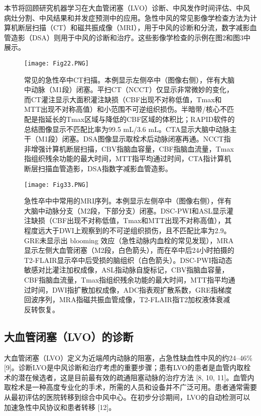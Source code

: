 \documentclass[11pt]{article}
\begin{document}
本节将回顾研究机器学习在大血管闭塞（LVO）诊断、中风发作时间评估、中风病灶分割、中风结果和并发症预测中的应用。急性中风的常见影像学检查方法为计算机断层扫描（CT）和磁共振成像（MRI），用于中风的诊断和分流，数字减影血管造影（DSA）则用于中风的诊断和治疗。这些影像学检查的示例在图2和图3中展示。

\begin{figure}[!htb]
	\centering
	\texttt{[image: Fig22.PNG]}
	\caption{\kaishu 常见的急性卒中CT扫描。本例显示左侧卒中（图像右侧），伴有大脑中动脉（M1段）闭塞。平扫CT（NCCT）仅显示非常微妙的变化，而CT灌注显示大面积灌注缺损（CBF出现不对称低值，Tmax和MTT出现不对称高值）和小范围不可逆组织损伤。半暗带/核心不匹配是指延长的Tmax区域与降低的CBF区域的体积比；RAPID软件的总结图像显示不匹配比率为99.5 mL/3.6 mL。CTA显示大脑中动脉主干（M1段）闭塞。DSA图像显示取栓术后动脉闭塞再通。NCCT指非增强计算机断层扫描，CBV指脑血容量，CBF指脑血流量，Tmax指组织残余功能的最大时间，MTT指平均通过时间，CTA指计算机断层扫描血管造影，DSA指数字减影血管造影。}
	\label{Fig2}
\end{figure}

\begin{figure}[!htb]
	\centering
	\texttt{[image: Fig33.PNG]}
	\caption{\kaishu 急性卒中中常用的MRI序列。本例显示左侧卒中（图像右侧），伴有大脑中动脉分支（M2段，下部分支）闭塞。DSC-PWI和ASL显示灌注缺损（CBF出现不对称低值，Tmax和MTT出现不对称高值），其程度远大于DWI上观察到的不可逆组织损伤，且不匹配比率为2.9。GRE未显示出 blooming 效应（急性动脉内血栓的常见发现），MRA显示左侧大血管闭塞（M2段，白色箭头），而在卒中后24小时拍摄的T2-FLAIR显示卒中后受损的脑组织（白色箭头）。DSC-PWI指动态敏感对比灌注加权成像，ASL指动脉自旋标记，CBV指脑血容量，CBF指脑血流量，Tmax指组织残余功能的最大时间，MTT指平均通过时间，DWI指扩散加权成像，ADC指表观扩散系数，GRE指梯度回波序列，MRA指磁共振血管成像，T2-FLAIR指T2加权液体衰减反转恢复。}
	\label{Fig3}
\end{figure}

\subsection{\kaishu 大血管闭塞（LVO）的诊断}

大血管闭塞（LVO）定义为近端颅内动脉的阻塞，占急性缺血性中风的约24–46\% [9]。诊断LVO是中风诊断和治疗考虑的重要步骤；患有LVO的患者是血管内取栓术的潜在候选者，这是目前最有效的疏通阻塞动脉的治疗方法 [8, 10, 11]。血管内取栓术是一种高度专业化的手术，所需的人员和设备并不广泛可用。患者通常需要从最初评估的医院转移到综合中风中心。在初步分诊期间，LVO的自动检测可以加速急性中风协议和患者转移 [12]。
\end{document}
